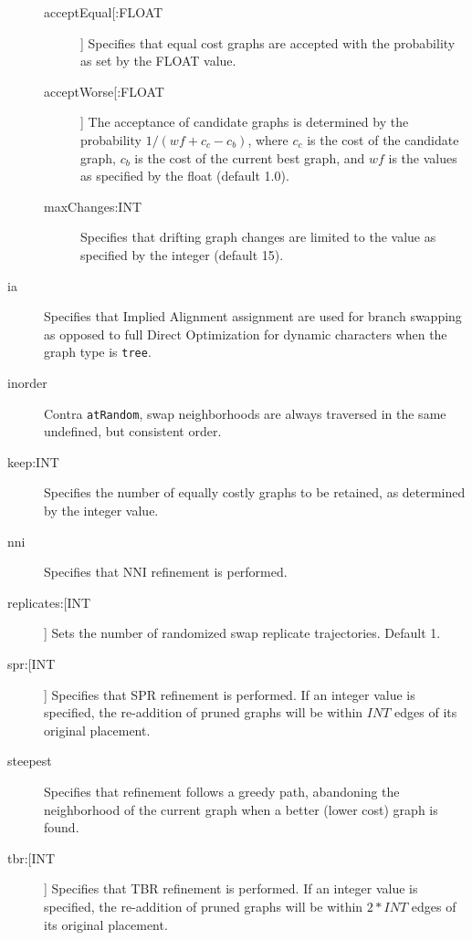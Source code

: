 \begin{description}
			\begin{description}
			
			\item[acceptEqual[:FLOAT]] Specifies that equal cost graphs are accepted with the
			probability as set by the FLOAT value. 
			
			\item[acceptWorse[:FLOAT]] The acceptance of candidate graphs is determined by the 
			probability $1/ (wf + c_c - c_b)$, where $c_c$ is the cost of the candidate graph, $c_b$ 
			is the cost of the current best graph, and $wf$ is the values as specified by the float 
			(default 1.0). 	
			
			\item[maxChanges:INT] Specifies that drifting graph changes are limited to the 
			value as specified by the integer (default 15).
			
			\end{description}
		
		\item[ia] Specifies that Implied Alignment \citep{Wheeler2003} assignment are used for 
		branch swapping as opposed to full Direct Optimization for dynamic characters when the 
		graph type is \texttt{tree}.
		
		\item[inorder] Contra \texttt{atRandom}, swap neighborhoods are always traversed 
		in the same undefined, but consistent order.
		
		\item[keep:INT] Specifies the number of equally costly graphs to be retained, as
		determined by the integer value.		
		
		\item[nni] Specifies that NNI refinement \citep{CaminandSokal1965, Robinson1971} 
		is performed.
		
		\item[replicates:[INT]] Sets the number of randomized swap replicate trajectories. Default 1.
		
		\item[spr:[INT]] Specifies that SPR refinement \citep{Dayhoff1969} is performed. If an 
		integer value is specified, the re-addition of pruned graphs will be within $INT$ 
		edges of its original placement.
		
		\item[steepest] Specifies that refinement follows a greedy path, abandoning the 
		neighborhood of the current graph when a better (lower cost) graph is found.  		
		
		\item[tbr:[INT]] Specifies that TBR refinement \citep{Farris1988, swofford1990a} 
		is performed. If an integer value is specified, the re-addition of pruned graphs 
		will be within $2 * INT$ edges of its original placement.
		\end{description}	
		
